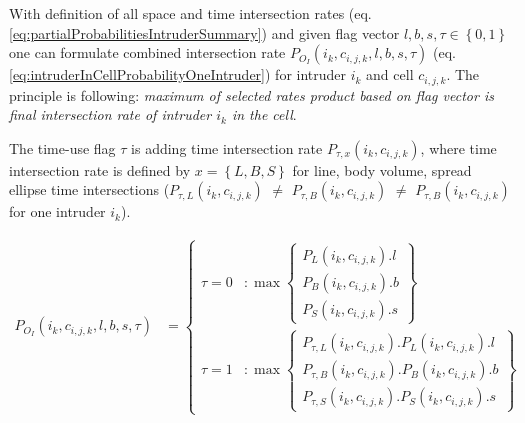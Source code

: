 \noindent With definition of all space and time intersection rates (eq. \ref{eq:partialProbabilitiesIntruderSummary}) and given flag vector $l,b,s,\tau \in\left\{0,1\right\}$ one can formulate combined intersection rate $P_{O_I}(i_k,c_{i,j,k},l,b,s,\tau)$ (eq. \ref{eq:intruderInCellProbabilityOneIntruder}) for intruder $i_k$ and cell $c_{i,j,k}$. The principle is following: \emph{maximum of selected rates product based on flag vector is final intersection rate of intruder $i_k$ in the cell}. 

The time-use flag $\tau$ is adding time intersection rate $P_{\tau,x}(i_k,c_{i,j,k})$, where time intersection rate is defined by $x=\left\{L,B,S\right\}$ for line, body volume, spread ellipse time intersections ($P_{\tau,L}(i_k,c_{i,j,k})$ $\neq$ $P_{\tau,B}(i_k,c_{i,j,k})$ $\neq$ $P_{\tau,B}(i_k,c_{i,j,k})$ for one intruder $i_k$).

\begin{equation}\label{eq:intruderInCellProbabilityOneIntruder}
    \begin{aligned}
        P_{O_I}(i_k,c_{i,j,k},l,b,s,\tau) & = \begin{cases}\tau=0&:\max\left\{\begin{aligned}P_L(i_k,c_{i,j,k}).l\\ P_B(i_k,c_{i,j,k}).b\\P_S(i_k,c_{i,j,k}).s\end{aligned}\right\}\\\tau=1&:\max\left\{\begin{aligned}P_{\tau,L}(i_k,c_{i,j,k}).P_L(i_k,c_{i,j,k}).l\\ P_{\tau,B}(i_k,c_{i,j,k}).P_B(i_k,c_{i,j,k}).b\\P_{\tau,S}(i_k,c_{i,j,k}).P_S(i_k,c_{i,j,k}).s\end{aligned}\right\}\end{cases} &\\
    \end{aligned}
\end{equation}
